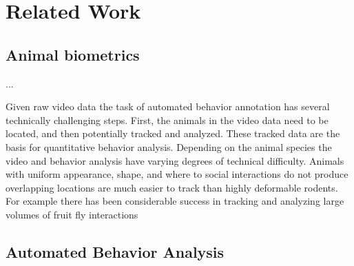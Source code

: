 \documentclass[conference,10pt,times,letter]{IEEEtran}
\begin{document}








\section{Related Work}


\subsection{Animal biometrics}
\label{sec:biometrics} 

\cite{kuhl2013animal} ...


\label{sec:related}

Given raw video data the task of automated behavior annotation has several technically challenging steps. First, the animals in the video data need to be located, and then potentially tracked and analyzed. These tracked data are the basis for quantitative behavior analysis. Depending on the animal species the video and behavior analysis have varying degrees of technical difficulty. Animals with uniform appearance, shape, and where to social interactions do not produce overlapping locations are much easier to track than highly deformable rodents. For example there has been considerable success in tracking and analyzing large volumes of fruit fly interactions

\subsection{Automated Behavior Analysis}
\end{document}
